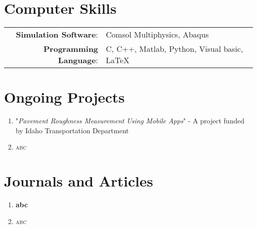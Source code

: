 \documentclass[a4paper,10pt]{article}
\begin{document}
\section{Computer Skills}
\begin{tabular}{rl}
 \textbf{Simulation Software}:& Comsol Multiphysics, Abaqus\\
\textbf{Programming Language}:& C, C++, Matlab, Python, Visual basic, \LaTeX\\
\end{tabular}

\newpage
\section{Ongoing Projects}
\begin{enumerate}
	\item"\textit{Pavement Roughness Measurement Using Mobile Apps}" - A project funded by Idaho Transportation Department
	\item\textsc{abc}
\end{enumerate}
\section{Journals and Articles}
\begin{enumerate}
	\item\textbf{abc}
	\item\textsc{abc}
\end{enumerate}
\end{document}
